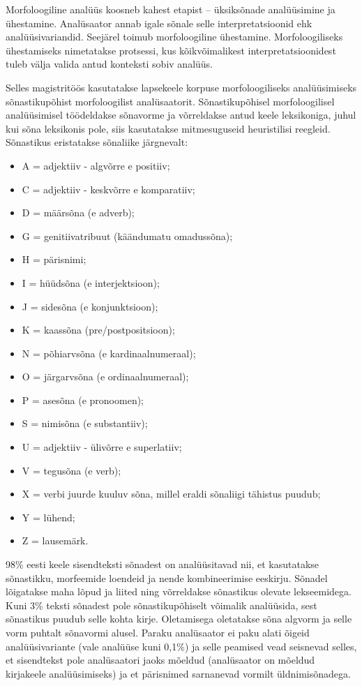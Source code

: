 \documentclass[12pt]{article}
\begin{document}
Morfoloogiline analüüs koosneb kahest etapist -- üksiksõnade analüüsimine ja ühestamine. Analüsaator annab igale sõnale selle interpretatsioonid ehk analüüsivariandid. Seejärel toimub morfoloogiline ühestamine. Morfoloogiliseks ühestamiseks nimetatakse protsessi, kus kõikvõimalikest interpretatsioonidest tuleb välja valida antud konteksti sobiv analüüs.\citep[90]{KV}

Selles magistritöös kasutatakse lapsekeele korpuse morfoloogiliseks analüüsimiseks sõnastikupõhist morfoloogilist analüsaatorit. Sõnastikupõhisel morfoloogilisel analüüsimisel töödeldakse sõnavorme ja võrreldakse antud keele leksikoniga, juhul kui sõna leksikonis pole, siis kasutatakse mitmesuguseid heuristilisi reegleid. Sõnastikus eristatakse sõnaliike järgnevalt:


\begin{itemize}
    \item A = adjektiiv - algvõrre e positiiv;
    \item C = adjektiiv - keskvõrre e komparatiiv;
    \item D = määrsõna (e adverb);
    \item G = genitiivatribuut (käändumatu omadussõna);
    \item H = pärisnimi;
    \item I = hüüdsõna (e interjektsioon);
    \item J = sidesõna (e konjunktsioon);
    \item K = kaassõna (pre/postpositsioon);
    \item N = põhiarvsõna (e kardinaalnumeraal);
    \item O = järgarvsõna (e ordinaalnumeraal);
    \item P = asesõna (e pronoomen);
    \item S = nimisõna (e substantiiv);
    \item U = adjektiiv - ülivõrre e superlatiiv;
    \item V = tegusõna (e verb);
    \item X = verbi juurde kuuluv sõna, millel eraldi sõnaliigi tähistus puudub;
    \item Y = lühend;
    \item Z = lausemärk. \citep{VABAMORF}
\end{itemize}


98\% eesti keele sisendteksti sõnadest on analüüsitavad nii, et kasutatakse sõnastikku, morfeemide loendeid ja nende kombineerimise eeskirju. Sõnadel lõigatakse maha lõpud ja liited ning võrreldakse sõnastikus olevate lekseemidega. Kuni 3\% teksti sõnadest pole sõnastikupõhiselt võimalik analüüsida, sest sõnastikus puudub selle kohta kirje. Oletamisega oletatakse sõna algvorm ja selle vorm puhtalt sõnavormi alusel. Paraku analüsaator ei paku alati õigeid analüüsivariante (vale analüüse kuni 0,1\%) ja selle peamised vead seisnevad selles, et sisendtekst pole analüsaatori jaoks mõeldud (analüsaator on mõeldud kirjakeele analüüsimiseks) ja et pärisnimed sarnanevad vormilt üldnimisõnadega. \citep[91--93]{KV}
\end{document}
